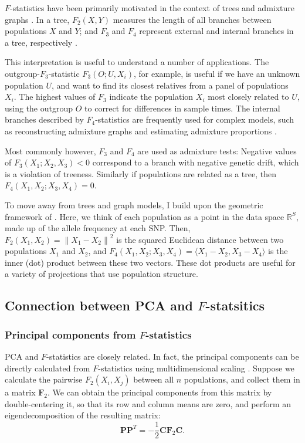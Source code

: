 \documentclass[12pt,a4pape, fullpage]{article}
\newcommand{\normsq}[1]{\left\lVert#1\right\rVert^2}
\newcommand{\MC}{\mathbf{C}} %
\newcommand{\MF}{\mathbf{F}_2} %
\newcommand{\MP}{\mathbf{P}} %
\begin{document}
$F$-statistics have been primarily motivated in the context of trees and admixture graphs \citep{patterson2012}. In a tree, $F_2(X, Y)$ measures the length of all branches between populations $X$ and $Y$; and $F_3$ and $F_4$ represent external and internal branches in a tree, respectively \citep{peter2016}.

This interpretation is useful to understand a number of applications. The outgroup-$F_3$-statistic $F_3(O; U, X_i)$, for example, is useful if we have an unknown population $U$, and want to find its closest relatives from a panel of populations $X_i$. The highest values of $F_3$ indicate the population $X_i$ most closely related to $U$, using the outgroup $O$ to correct for differences in sample times. The internal branches described by  $F_4$-statistics are frequently used for complex models, such as  reconstructing admixture graphs \citep{patterson2012, lipson2013} and estimating admixture proportions \citep{petr2019, harney2021}.

Most commonly however, $F_3$ and $F_4$ are used as admixture tests: Negative values of  $F_3(X_1; X_2, X_3) < 0$ correspond to a branch with negative genetic drift, which is a violation of treeness. Similarly if populations are related as a tree, then $F_4(X_1, X_2; X_3, X_4) =0$. 

To move away from trees and graph models, I build upon the geometric framework of \cite{oteo-garcia2021}. Here, we think of each population as a point in the data space $\mathbb{R}^S$, made up of the allele frequency at each SNP. Then, $F_2(X_1, X_2) = \normsq{X_1 - X_2}$ is the squared Euclidean distance between two populations $X_1$ and $X_2$, and $F_4(X_1, X_2 ; X_3, X_4) = \langle X_1 - X_2, X_3 - X_4 \rangle$ is the inner (dot) product between these two vectors. These dot products are useful for a variety of projections that use population structure.



\subsection{Connection between PCA and $F$-statsitics}	
\subsubsection{Principal components from $F$-statistics}
PCA and $F$-statistics are closely related. In fact, the principal components can be directly calculated from $F$-statistics using multidimensional scaling \citep{gower1966}. Suppose we calculate the pairwise $F_2(X_i, X_j)$ between all $n$ populations, and collect them in a matrix $\MF$. We can obtain the principal components from this matrix by double-centering it, so that its row and column means are zero, and perform an eigendecomposition of the resulting matrix:
\begin{equation}
\MP\MP^T = - \frac{1}{2}\MC\MF\MC \text{.} \label{eq:mds}
\end{equation}
\end{document}
